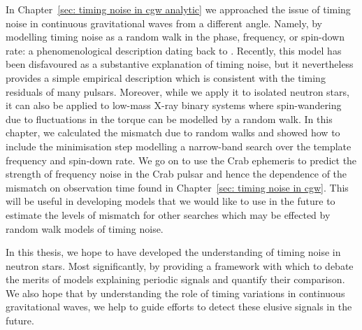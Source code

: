 \documentclass[twoside, 11pt]{thesis}
\begin{document}
In Chapter~\ref{sec: timing noise in cgw analytic} we approached the issue of
timing noise in continuous gravitational waves from a different angle. Namely,
by modelling timing noise as a random walk in the phase, frequency, or
spin-down rate: a phenomenological description dating back to
\citet{Boynton1972}. Recently, this model has been disfavoured
\citep{Hobbs2010} as a substantive explanation of timing noise, but it
nevertheless provides a simple empirical description which is consistent with
the timing residuals of many pulsars. Moreover, while we apply it to isolated
neutron stars, it can also be applied to low-mass X-ray binary systems where
spin-wandering due to fluctuations in the torque can be modelled by a random
walk. In this chapter, we calculated the mismatch due to random walks and
showed how to include the minimisation step modelling a narrow-band search over
the template frequency and spin-down rate.  We go on to use the Crab ephemeris
to predict the strength of frequency noise in the Crab pulsar and hence the
dependence of the mismatch on observation time found in Chapter~\ref{sec:
timing noise in cgw}. This will be useful in developing models that we would
like to use in the future to estimate the levels of mismatch for other searches
which may be effected by random walk models of timing noise.


In this thesis, we hope to have developed the understanding of timing noise in
neutron stars. Most significantly, by providing a framework with which to debate
the merits of models explaining periodic signals and quantify their comparison.
We also hope that by understanding the role of timing variations in continuous
gravitational waves, we help to guide efforts to detect these elusive signals
in the future.







\end{document}
